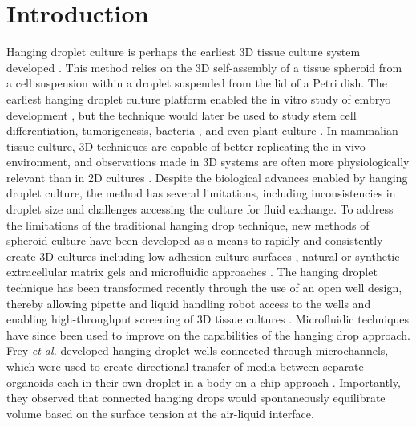 \section{Introduction}
Hanging droplet culture is perhaps the earliest 3D tissue culture system developed \cite{Harrison1910}. This method relies on the 3D self-assembly of a tissue spheroid from a cell suspension within a droplet suspended from the lid of a Petri dish. The earliest hanging droplet culture platform enabled the in vitro study of embryo development \cite{Harrison1910}, but the technique would later be used to study stem cell differentiation, tumorigenesis, bacteria \cite{Tittsler1936}, and even plant culture \cite{Muir1958}. In mammalian tissue culture, 3D techniques are capable of better replicating the in vivo environment, and observations made in 3D systems are often more physiologically relevant than in 2D cultures \cite{Abbott2003, Stegemann2003, Debnath2005, Folkman1973}. Despite the biological advances enabled by hanging droplet culture, the method has several limitations, including inconsistencies in droplet size and challenges accessing the culture for fluid exchange. To address the limitations of the traditional hanging drop technique, new methods of spheroid culture have been developed as a means to rapidly and consistently create 3D cultures including low-adhesion culture surfaces \cite{Turner2014}, natural or synthetic extracellular matrix gels \cite{Debnath2005, Karthaus2014, Lee2012} and microfluidic approaches \cite{Hsiao2009, Wu2008}. The hanging droplet technique has been transformed recently through the use of an open well design, thereby allowing pipette and liquid handling robot access to the wells and enabling high-throughput screening of 3D tissue cultures \cite{Tung2011}. Microfluidic techniques have since been used to improve on the capabilities of the hanging drop approach. Frey \textit{et al.}  developed hanging droplet wells connected through microchannels, which were used to create directional transfer of media between separate organoids each in their own droplet in a body-on-a-chip approach \cite{Frey2014}. Importantly, they observed that connected hanging drops would spontaneously equilibrate volume based on the surface tension at the air-liquid interface.

